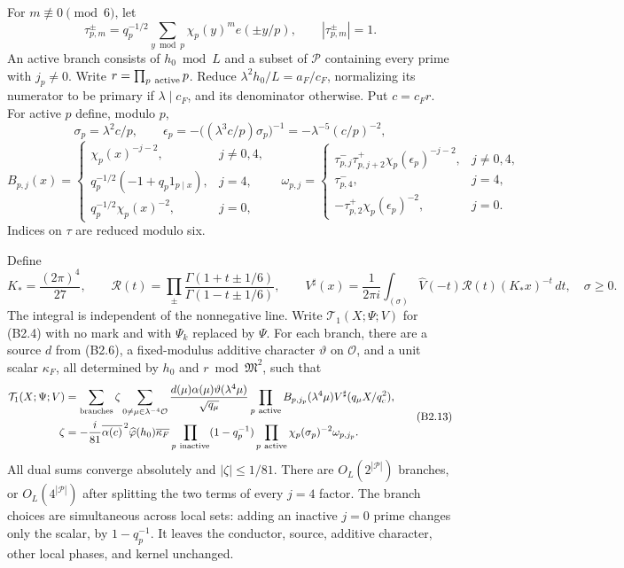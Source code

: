 \documentclass[11pt,a4paper]{article}
\begin{document}
For \(m\not\equiv0\pmod6\), let \[
\tau_{p,m}^{\pm}=q_p^{-1/2}\sum_{y\bmod p}\chi_p(y)^m e(\pm y/p),
\qquad |\tau_{p,m}^{\pm}|=1.
\] An active branch consists of \(h_0\bmod L\) and a subset of
\(\mathcal P\) containing every prime with \(j_p\ne0\). Write
\(r=\prod_{p\ {\rm active}}p\). Reduce \(\lambda^2h_0/L=a_F/c_F\),
normalizing its numerator to be primary if \(\lambda\mid c_F\), and its
denominator otherwise. Put \(c=c_Fr\). For active \(p\) define, modulo
\(p\), \[
\sigma_p=\lambda^2c/p,\qquad
\epsilon_p=-\bigl((\lambda^3c/p)\sigma_p\bigr)^{-1}
          =-\lambda^{-5}(c/p)^{-2},
\] \[
B_{p,j}(x)=
\begin{cases}
\chi_p(x)^{-j-2},&j\ne0,4,\\
q_p^{-1/2}(-1+q_p1_{p\mid x}),&j=4,\\
q_p^{-1/2}\chi_p(x)^{-2},&j=0,
\end{cases}
\quad
\omega_{p,j}=
\begin{cases}
\tau_{p,j}^-\tau_{p,j+2}^+\chi_p(\epsilon_p)^{-j-2},&j\ne0,4,\\
\tau_{p,4}^-,&j=4,\\
-\tau_{p,2}^+\chi_p(\epsilon_p)^{-2},&j=0.
\end{cases}
\tag{B2.11}
\] Indices on \(\tau\) are reduced modulo six.

Define \[
K_*=\frac{(2\pi)^4}{27},\qquad
\mathcal R(t)=\prod_\pm\frac{\Gamma(1+t\pm1/6)}{\Gamma(1-t\pm1/6)},\qquad
V^\sharp(x)=\frac1{2\pi i}\int_{(\sigma)}
\widehat V(-t)\mathcal R(t)(K_*x)^{-t}\,dt,\quad \sigma\ge0.
\tag{B2.12}
\] The integral is independent of the nonnegative line. Write
\(\mathcal T_1(X;\Psi;V)\) for (B2.4) with no mark and with \(\Psi_k\)
replaced by \(\Psi\). For each branch, there are a source \(d\) from
(B2.6), a fixed-modulus additive character \(\vartheta\) on
\(\mathcal O\), and a unit scalar \(\kappa_F\), all determined by
\(h_0\) and \(r\bmod\mathfrak M^2\), such that \[
\begin{aligned}
\mathcal T_1(X;\Psi;V)
&=\sum_{\rm branches}\zeta
\sum_{0\ne\mu\in\lambda^{-4}\mathcal O}
\frac{d(\mu)\alpha(\mu)\vartheta(\lambda^4\mu)}{\sqrt{q_\mu}}
\prod_{p\ {\rm active}}B_{p,j_p}(\lambda^4\mu)
V^\sharp(q_\mu X/q_c^2),\\
\zeta&=-\frac{i}{81}\overline{\alpha(c)}^{\,2}
\widehat\varphi(h_0)\overline{\kappa_F}
\prod_{p\ {\rm inactive}}(1-q_p^{-1})
\prod_{p\ {\rm active}}\chi_p(\sigma_p)^{-2}\omega_{p,j_p}.
\end{aligned}
\tag{B2.13}
\] All dual sums converge absolutely and \(|\zeta|\le1/81\). There are
\(O_L(2^{|\mathcal P|})\) branches, or \(O_L(4^{|\mathcal P|})\) after
splitting the two terms of every \(j=4\) factor. The branch choices are
simultaneous across local sets: adding an inactive \(j=0\) prime changes
only the scalar, by \(1-q_p^{-1}\). It leaves the conductor, source,
additive character, other local phases, and kernel unchanged.
\end{document}
